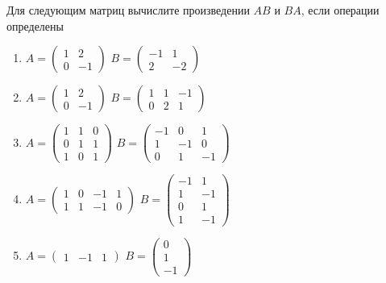 \begin{exercise}
Для следующим матриц вычислите произведении \(AB\) и \(BA\), если операции определены
\begin{enumerate}
	\item \(A=\begin{pmatrix} 1 & 2 \\ 0 & -1 \end{pmatrix}\) 
	\(B=\begin{pmatrix} -1 & 1 \\ 2 & -2 \end{pmatrix}\)
	\item \(A=\begin{pmatrix} 1 & 2 \\ 0 & -1 \end{pmatrix}\) 
	\(B=\begin{pmatrix} 1 & 1 & -1 \\ 0 & 2 & 1 \end{pmatrix}\)
	\item \(A=\begin{pmatrix} 1 & 1 & 0 \\ 0 & 1 & 1 \\ 1 & 0 & 1 \end{pmatrix}\) 
	\(B=\begin{pmatrix} -1 & 0 & 1 \\ 1 & -1 & 0 \\ 0 & 1 & -1 \end{pmatrix}\)
	\item \(A=\begin{pmatrix} 1 & 0 & -1 & 1\\ 1 & 1 & -1 & 0  \end{pmatrix}\) 
	\(B=\begin{pmatrix} -1 & 1 \\ 1 & -1 \\ 0 & 1 \\ 1 & -1 \end{pmatrix}\)
	\item \(A=\begin{pmatrix} 1 & -1 & 1 \end{pmatrix}\) 
	\(B=\begin{pmatrix} 0 \\ 1 \\ -1 \end{pmatrix}\)
\end{enumerate}
\end{exercise}

